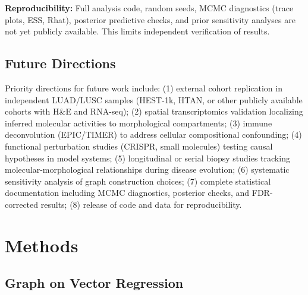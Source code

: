 \documentclass[pdflatex,article,12pt]{article}
\begin{document}
\textbf{Reproducibility:} Full analysis code, random seeds, MCMC diagnostics (trace plots, ESS, Rhat), posterior predictive checks, and prior sensitivity analyses are not yet publicly available. This limits independent verification of results.

\subsection{Future Directions}

Priority directions for future work include: (1) external cohort replication in independent LUAD/LUSC samples (HEST-1k, HTAN, or other publicly available cohorts with H&E and RNA-seq); (2) spatial transcriptomics validation localizing inferred molecular activities to morphological compartments; (3) immune deconvolution (EPIC/TIMER) to address cellular compositional confounding; (4) functional perturbation studies (CRISPR, small molecules) testing causal hypotheses in model systems; (5) longitudinal or serial biopsy studies tracking molecular-morphological relationships during disease evolution; (6) systematic sensitivity analysis of graph construction choices; (7) complete statistical documentation including MCMC diagnostics, posterior checks, and FDR-corrected results; (8) release of code and data for reproducibility.




\section{Methods}

\subsection{Graph on Vector Regression}
\end{document}
